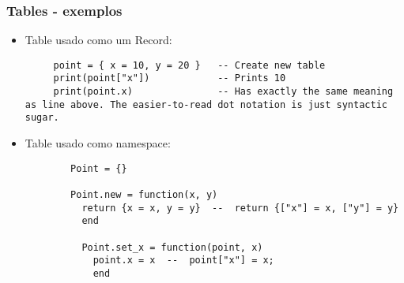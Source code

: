 \documentclass{ime-beamer}
\begin{document}

\begin{frame}[fragile]
  \frametitle{Tables - exemplos}
  \begin{block}{}
    \begin{itemize}
      \item Table usado como um Record: 
        \begin{lstlisting}
     point = { x = 10, y = 20 }   -- Create new table
     print(point["x"])            -- Prints 10
     print(point.x)               -- Has exactly the same meaning as line above. The easier-to-read dot notation is just syntactic sugar.
        \end{lstlisting}
      \item Table usado como namespace:
        \begin{lstlisting}
        Point = {}
         
        Point.new = function(x, y)
          return {x = x, y = y}  --  return {["x"] = x, ["y"] = y}
          end
           
          Point.set_x = function(point, x)
            point.x = x  --  point["x"] = x;
            end
        \end{lstlisting}
    \end{itemize}
  \end{block}
\end{frame}
\end{document}

